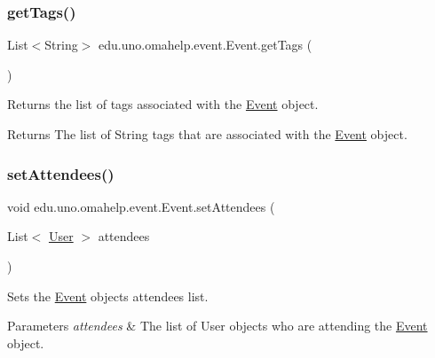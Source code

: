 \subsubsection{\texorpdfstring{get\+Tags()}{getTags()}}
{\footnotesize\ttfamily List$<$String$>$ edu.\+uno.\+omahelp.\+event.\+Event.\+get\+Tags (\begin{DoxyParamCaption}{ }\end{DoxyParamCaption})}

Returns the list of tags associated with the \mbox{\hyperlink{classedu_1_1uno_1_1omahelp_1_1event_1_1_event}{Event}} object.

\begin{DoxyReturn}{Returns}
The list of String tags that are associated with the \mbox{\hyperlink{classedu_1_1uno_1_1omahelp_1_1event_1_1_event}{Event}} object. 
\end{DoxyReturn}
\mbox{\label{classedu_1_1uno_1_1omahelp_1_1event_1_1_event_a784217984c5b0b29ae69d64574aab88d}} 
\subsubsection{\texorpdfstring{set\+Attendees()}{setAttendees()}}
{\footnotesize\ttfamily void edu.\+uno.\+omahelp.\+event.\+Event.\+set\+Attendees (\begin{DoxyParamCaption}\item[{List$<$ \mbox{\hyperlink{classedu_1_1uno_1_1omahelp_1_1user_1_1_user}{User}} $>$}]{attendees }\end{DoxyParamCaption})}

Sets the \mbox{\hyperlink{classedu_1_1uno_1_1omahelp_1_1event_1_1_event}{Event}} object\textquotesingle{}s attendees list.


\begin{DoxyParams}{Parameters}
{\em attendees} & The list of User objects who are attending the \mbox{\hyperlink{classedu_1_1uno_1_1omahelp_1_1event_1_1_event}{Event}} object. \\
\hline
\end{DoxyParams}
\mbox{\label{classedu_1_1uno_1_1omahelp_1_1event_1_1_event_a054a2a51f266b0db935727c39e9d1b9c}} 
